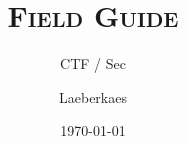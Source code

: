 \documentclass[a4paper,DIV=calc,11pt]{scrartcl}
\begin{document}
	
\onehalfspace %
	
\title{\textsc{Field Guide}}
\subtitle{CTF / Sec}
\date{\small \today}
\author{Laeberkaes}
\maketitle %

\tableofcontents
\newpage









\end{document}
